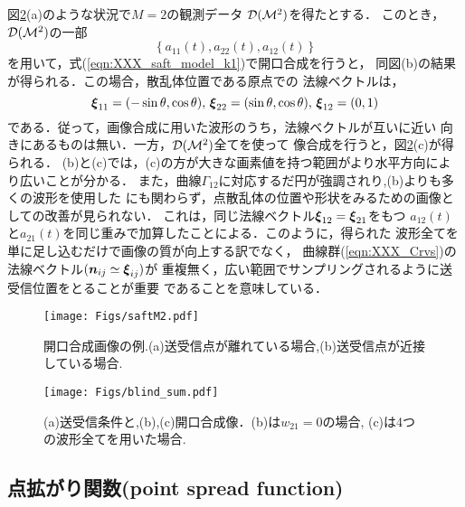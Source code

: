 図\ref{fig:XXX_blind_sum}(a)のような状況で$M=2$の観測データ
${\cal D}({\cal M}^2)$を得たとする．
このとき，${\cal D}({\cal M}^2)$の一部
\begin{equation}
	\left\{ 
		a_{11}(t), a_{22}(t), a_{12}(t) 
	\right\}
	\label{eqn:}
\end{equation}
を用いて，式(\ref{eqn:XXX_saft_model_k1})で開口合成を行うと，
同図(b)の結果が得られる．この場合，散乱体位置である原点での
法線ベクトルは，
\begin{equation}
	\mbox{\boldmath $\xi$}_{11}=(-\sin\theta,\cos\theta), \,
	\mbox{\boldmath $\xi$}_{22}=( \sin\theta,\cos\theta), \,
	\mbox{\boldmath $\xi$}_{12}=(0,1)
	\label{eqn:XXX_11}
\end{equation}
である．従って，画像合成に用いた波形のうち，法線ベクトルが互いに近い
向きにあるものは無い．一方，${\cal D}({\cal M}^2)$全てを使って
像合成を行うと，図\ref{fig:XXX_blind_sum}(c)が得られる．
(b)と(c)では，(c)の方が大きな画素値を持つ範囲がより水平方向により広いことが分かる．
また，曲線$\Gamma_{12}$に対応するだ円が強調されり,(b)よりも多くの波形を使用した
にも関わらず，点散乱体の位置や形状をみるための画像としての改善が見られない．
これは，同じ法線ベクトル$\mbox{\boldmath $\xi$}_{12}=\mbox{\boldmath $\xi$}_{21}$をもつ
$a_{12}(t)$と$a_{21}(t)$を同じ重みで加算したことによる．このように，得られた
波形全てを単に足し込むだけで画像の質が向上する訳でなく，
曲線群(\ref{eqn:XXX_Crvs})の法線ベクトル$(\mbox{\boldmath $n$}_{ij}\simeq \mbox{\boldmath $\xi$}_{ij})$が
重複無く，広い範囲でサンプリングされるように送受信位置をとることが重要
であることを意味している．
\begin{figure}[h]
	\begin{center}
	\texttt{[image: Figs/saftM2.pdf]} 
	\end{center}
	\caption{開口合成画像の例.(a)送受信点が離れている場合,(b)送受信点が近接している場合.} 
	\label{fig:XXX_saftM2}
\end{figure}
\begin{figure}[h]
	\begin{center}
	\texttt{[image: Figs/blind\_sum.pdf]} 
	\end{center}
	\caption{(a)送受信条件と,(b),(c)開口合成像．(b)は$w_{21}=0$の場合, (c)は4つの波形全てを用いた場合.}
	\label{fig:XXX_blind_sum}
\end{figure}
\subsection{点拡がり関数(point spread function)}
